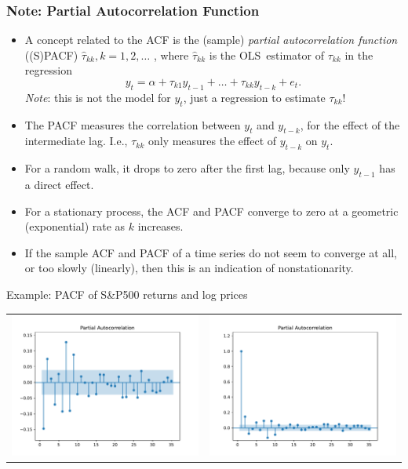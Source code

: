 \begin{frame}
\frametitle{Note: Partial Autocorrelation Function}
\begin{itemize}
\item A concept related to the ACF is the (sample) \emph{\color{red}partial
autocorrelation function} ((S)PACF) $\hat{\tau}_{kk},k=1,2,\ldots $
, where $\hat{\tau}_{kk}$ is the OLS\ estimator of $%
\tau _{kk}$ in the regression
\begin{equation*}
y_t=\alpha +\tau _{k1}y_{t-1}+\ldots +\tau _{kk}y_{t-k}+e_t.
\end{equation*}
\emph{\color{red}Note}: this is not the model for $y_t$, just a regression
to estimate $\tau _{kk}$!
\item The PACF measures the correlation between $y_t$ and $y_{t-k}$,  for the effect of the intermediate lag. I.e., $\tau _{kk}$ only
measures the  effect of $y_{t-k}$ on $y_t$.
\item For a random walk, it drops to zero after the first lag, because only $y_{t-1}$ has a direct effect.
\item For a stationary process, the ACF and PACF
converge to zero at a geometric (exponential) rate as $k$ increases.
\item
If the sample ACF and PACF of a time series
do not seem to converge at all, or too slowly (linearly), then this is an
indication of nonstationarity.
\end{itemize}
\end{frame}
\begin{frame}
	\begin{block}{Example: PACF of S\&P500 returns and log prices}
		\begin{centering}
			\begin{tabular}{cc}
				\includegraphics[width=.45\textwidth]{sp500_pacf}&
				\includegraphics[width=.45\textwidth]{sp500_pacf_levels}
			\end{tabular}
		\end{centering}
	\end{block}
\end{frame}
